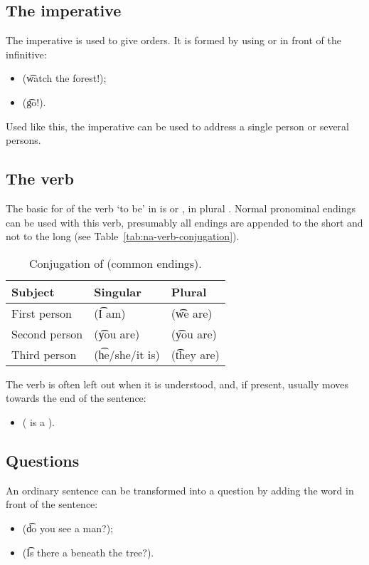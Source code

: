 \subsection{The imperative}
The imperative is used to give orders. It is formed by using  or  in
front of the infinitive:
\begin{itemize}
  \item {} (\t{watch the forest!});
  \item {} (\t{go!}).
\end{itemize}
Used like this, the imperative can be used to address a single person or several
persons.

\subsection{The verb }
The basic for of the verb `to be' in \quenya is  or ,
in plural . Normal pronominal endings can be used with this verb,
presumably all endings are appended to the short  and not to the long
 (see Table~\ref{tab:na-verb-conjugation}).

\begin{table}
\centering
\caption{Conjugation of  (common endings).}
\begin{tabular}{lll}
\toprule
Subject & Singular & Plural \\
\midrule
First person & \q{} (\t{I am}) & \q{} (\t{we are}) \\
Second person & \q{} (\t{you are}) & \q{} (\t{you are}) \\
Third person & \q{} (\t{he/she/it is}) & \q{} (\t{they are}) \\
\bottomrule
\end{tabular}
\end{table}

The verb  is often left out when it is understood, and, if present,
usually moves towards the end of the sentence:
\begin{itemize}
  \item {} (\t{ is a }).
\end{itemize}

\subsection{Questions}
An ordinary sentence can be transformed into a question by adding the word
 in front of the sentence:
\begin{itemize}
  \item {} (\t{do you see a man?});
  \item {} (\t{Is there a  beneath the tree?}).
\end{itemize}

